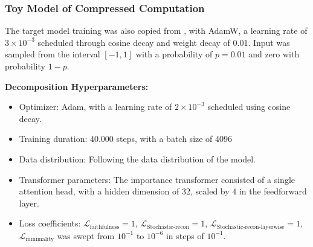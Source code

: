 \documentclass{article}
\begin{document}
\subsubsection{Toy Model of Compressed Computation}

The target model training was also copied from \autocite{stochasticparameterdecomposition},
with AdamW, a learning rate of $3 \times 10^{-3}$ scheduled through cosine decay
and weight decay of 0.01. Input was sampled from the interval $[-1,1]$ with a probability of $p = 0.01$ and zero with probability $1-p$.

\textbf{Decomposition Hyperparameters:}
\renewcommand\labelitemi{\tiny$\bullet$}
\begin{itemize}
    \setlength\itemsep{0em}
    \item Optimizer: Adam, with a learning rate of $2 \times 10^{-3}$ scheduled using cosine decay.
    \item Training duration: 40.000 steps, with a batch size of 4096
    \item Data distribution: Following the data distribution of the model.
    \item Transformer parameters: The importance transformer consisted of a single attention head, with a hidden dimension of 32, scaled by $4$ in the feedforward layer. 
    \item Loss coefficients: $\mathcal{L}_{\text{faithfulness}}=1$, $\mathcal{L}_{\text{Stochastic-recon}}=1$, $\mathcal{L}_{\text{Stochastic-recon-layerwise}}=1$, $\mathcal{L}_{\text{minimality}}$ was swept from $10^{-1}$ to $10^{-6}$ in steps of $10^{-1}$.
\end{itemize}
\end{document}

